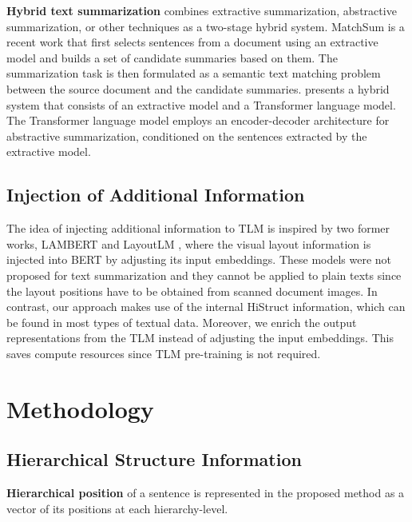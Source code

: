 \documentclass[11pt]{article}
\begin{document}
\textbf{Hybrid text summarization} combines extractive summarization, abstractive summarization, or other techniques as a two-stage hybrid system.
 MatchSum \cite{zhong-etal-2020-extractive} is a recent work that first selects sentences from a document using an extractive model and builds a set of candidate summaries based on them. The summarization task is then formulated as a semantic text matching problem between the source document and the candidate summaries.  \citet{pilault-etal-2020-extractive} presents a hybrid system that consists of an extractive model and a Transformer language model. The Transformer language model employs an encoder-decoder architecture for abstractive summarization, conditioned on the sentences extracted by the extractive model.

 
\subsection{Injection of Additional Information}
\label{subsec:Hierarchical learning}



The idea of injecting additional information to TLM is inspired by two former works, LAMBERT \cite{lambert} and LayoutLM \cite{layoutlm}, where the visual layout information is injected into BERT by adjusting its input embeddings. 
These models were not proposed for text summarization and they cannot be applied to plain texts since the layout positions have to be obtained from scanned document images. In contrast, our approach makes use of the internal HiStruct information, which can be found in most types of textual data. Moreover, we enrich the output representations from the TLM instead of adjusting the input embeddings. This saves compute resources since TLM pre-training is not required.

\section{Methodology}
\label{sec:Methodology}

\subsection{Hierarchical Structure Information}
\label{subsec:hierarchical_structure_features}

\textbf{Hierarchical position} of a sentence is represented in the proposed method as a vector of its positions at each hierarchy-level. 
\end{document}
